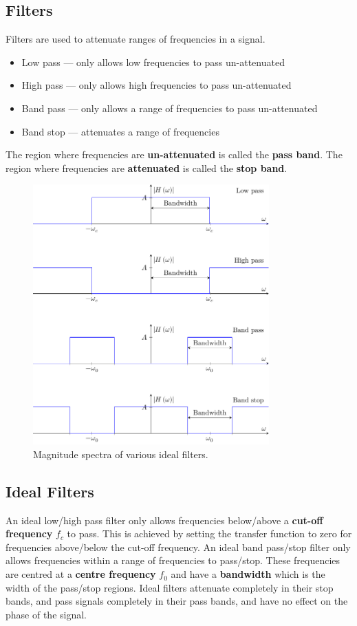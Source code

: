 \documentclass{article}
\begin{document}
\subsection{Filters}
Filters are used to attenuate ranges of frequencies in a signal.
\begin{itemize}
    \item Low pass --- only allows low frequencies to pass
          un-attenuated
    \item High pass --- only allows high frequencies to pass
          un-attenuated
    \item Band pass --- only allows a range of frequencies to pass
          un-attenuated
    \item Band stop --- attenuates a range of frequencies
\end{itemize}
The region where frequencies are \textbf{un-attenuated} is called the \textbf{pass band}.
The region where frequencies are \textbf{attenuated} is called the \textbf{stop band}.
\begin{figure}[H]
    \centering
    \includegraphics[height = 10cm]{figures/filters.pdf}
    \caption{Magnitude spectra of various ideal filters.} %
\end{figure}
\subsection{Ideal Filters}
An ideal low/high pass filter only allows frequencies below/above a
\textbf{cut-off frequency} \(f_c\) to pass. This is achieved by setting
the transfer function to zero for frequencies above/below the cut-off
frequency. An ideal band pass/stop filter only allows frequencies
within a range of frequencies to pass/stop. These frequencies are
centred at a \textbf{centre frequency} \(f_0\) and have a
\textbf{bandwidth} which is the width of the pass/stop regions. Ideal
filters attenuate completely in their stop bands, and pass signals
completely in their pass bands, and have no effect on the phase of the
signal.
\end{document}
